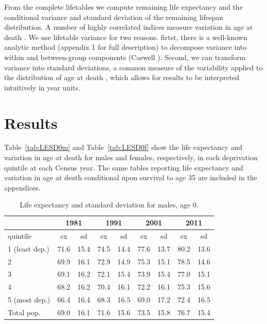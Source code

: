 \documentclass[12pt,oneside,a4paper]{article} %
\theoremstyle{definition}
\begin{document}
From the complete lifetables we compute remaining
life expectancy and the conditional variance and standard deviation of
the remaining lifespan distribution. A number of highly correlated indices measure variation in age at
death \citep{Raalte2013}. We use lifetable variance for
two reasons. firtst, there is a well-known analytic method (appendix 1 for full description) to decompose variance
into within and between-group components (Caswell \citeyear{Caswell2001,Caswell2009,Caswell2014}). Second, we can transform variance into standard deviations, a common measure of the variability applied to the distribution of age at death \citep{Raalte2013}, which allows for results to be interpreted intuitively in year units. 


\section{Results}
Table~\ref{tab:LESD0m} and Table~\ref{tab:LESD0f} show the life expectancy and
variation in age at death for males and females, respectively, in each
deprivation quintile at each Census year. The same tables reporting life expectancy and variation in age at death conditional upon survival to age 35 are included in the appendices.

\begin{table}[htbp]
  \centering
  \caption{Life expectancy and standard deviation for males, age 0.}
  \label{tab:LESD0m} %
    \begin{tabular}{lrrrrrrrr}
          & \multicolumn{2}{c}{1981} & \multicolumn{2}{c}{1991} & \multicolumn{2}{c}{2001} & \multicolumn{2}{c}{2011} \\
    \midrule
    quintile & \multicolumn{1}{c}{ex} & \multicolumn{1}{c}{sd} & \multicolumn{1}{c}{ex} & \multicolumn{1}{c}{sd} & \multicolumn{1}{c}{ex} & \multicolumn{1}{c}{sd} & \multicolumn{1}{c}{ex} & \multicolumn{1}{c}{sd} \\
    \midrule
    1 (least dep.) & 71.6  & 15.4  & 74.5  & 14.4  & 77.6  & 13.7  & 80.2  & 13.6 \\
    2     & 69.9  & 16.1  & 72.9  & 14.9  & 75.3  & 15.1  & 78.5  & 14.6 \\
    3     & 69.1  & 16.2  & 72.1  & 15.4  & 73.9  & 15.4  & 77.0  & 15.1 \\
    4     & 68.2  & 16.2  & 70.4  & 16.1  & 72.2  & 16.1  & 75.3  & 15.6 \\
    5 (most dep.) & 66.4  & 16.4  & 68.3  & 16.5  & 69.0  & 17.2  & 72.4  & 16.5 \\
    Total pop. & 69.0  & 16.1  & 71.6  & 15.6  & 73.5  & 15.8  & 76.7  & 15.4 \\
    \bottomrule
    \end{tabular}%
  \label{tab:addlabel}%
\end{table}%
\end{document}
